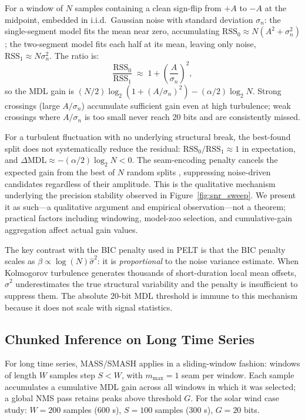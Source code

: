 \documentclass[12pt,letterpaper]{article}
\newcommand{\MDL}{\mathrm{MDL}}
\newcommand{\RSS}{\mathrm{RSS}}
\begin{document}
For a window of $N$ samples containing a clean sign-flip from $+A$ to $-A$
at the midpoint, embedded in i.i.d.\ Gaussian noise with standard deviation
$\sigma_n$:
the single-segment model fits the mean near zero, accumulating
$\RSS_0 \approx N(A^2 + \sigma_n^2)$; the two-segment model fits each half
at its mean, leaving only noise, $\RSS_1 \approx N\sigma_n^2$.
The ratio is:
\begin{equation}
  \frac{\RSS_0}{\RSS_1} \;\approx\; 1 + \left(\frac{A}{\sigma_n}\right)^2,
  \label{eq:rss_ratio}
\end{equation}
so the MDL gain is $(N/2)\log_2(1 + (A/\sigma_n)^2) - (\alpha/2)\log_2 N$.
Strong crossings (large $A/\sigma_n$) accumulate sufficient gain even at
high turbulence; weak crossings where $A/\sigma_n$ is too small never reach
20 bits and are consistently missed.

For a turbulent fluctuation with no underlying structural break, the
best-found split does not systematically reduce the residual:
$\RSS_0/\RSS_1 \approx 1$ in expectation, and
$\Delta\MDL \approx -(\alpha/2)\log_2 N < 0$.
The seam-encoding penalty cancels the expected gain from the best of $N$
random splits \citep{Rissanen1978,Davis2006}, suppressing noise-driven
candidates regardless of their amplitude.
This is the qualitative mechanism underlying the precision stability observed
in Figure~\ref{fig:snr_sweep}.
We present it as such---a qualitative argument and empirical observation---not
a theorem; practical factors including windowing, model-zoo selection, and
cumulative-gain aggregation affect actual gain values.

The key contrast with the BIC penalty used in PELT is that the BIC penalty
scales as $\beta \propto \log(N)\hat{\sigma}^2$: it is \emph{proportional}
to the noise variance estimate.
When Kolmogorov turbulence generates thousands of short-duration local mean
offsets, $\hat{\sigma}^2$ underestimates the true structural variability and
the penalty is insufficient to suppress them.
The absolute 20-bit MDL threshold is immune to this mechanism because it does
not scale with signal statistics.

\subsection{Chunked Inference on Long Time Series}
\label{subsec:chunked}

For long time series, MASS/SMASH applies in a sliding-window fashion: windows
of length $W$ samples step $S < W$, with $m_\mathrm{max}=1$ seam per window.
Each sample accumulates a cumulative MDL gain across all windows in which it
was selected; a global NMS pass retains peaks above threshold $G$.
For the solar wind case study: $W = 200$ samples (600 s), $S = 100$ samples
(300 s), $G = 20$ bits.
\end{document}
